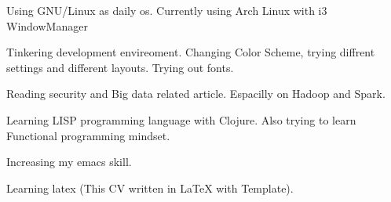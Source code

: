 

\begin{cventries}

  \cventry
    {} %
    {} %
    {} %
    {} %
    {
      \begin{cvitems} %
        \item {Using GNU/Linux as daily os. Currently using Arch Linux with i3 WindowManager}
        \item {Tinkering development envireoment. Changing Color Scheme, trying diffrent settings and different layouts. Trying out fonts. }
        \item {Reading security and Big data related article. Espacilly on Hadoop and Spark. }
        \item {Learning LISP programming language with Clojure. Also trying to learn Functional programming mindset. }
        \item {Increasing my emacs skill.}
        \item {Learning latex (This CV written in LaTeX with Template).}
      \end{cvitems}
    }


\end{cventries}
